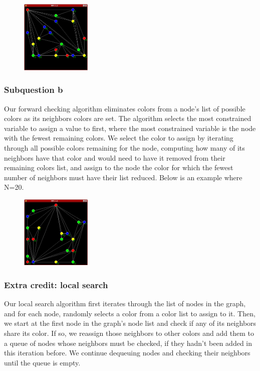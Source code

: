\begin{figure}[H]
  \centering
  \includegraphics[width=0.3\textwidth]{graphics/rand_assign_20.png}
\end{figure}

\subsubsection*{Subquestion b}
Our forward checking algorithm eliminates colors from a node's list of possible colors as its neighbors colors are set. The algorithm selects the most constrained variable to assign a value to first, where the most constrained variable is the node with the fewest remaining colors. We select the color to assign by iterating through all possible colors remaining for the node, computing how many of its neighbors have that color and would need to have it removed from their remaining colors list, and assign to the node the color for which the fewest number of neighbors must have their list reduced. Below is an example where N=20.

\begin{figure}[H]
  \centering
  \includegraphics[width=0.3\textwidth]{graphics/forward_assign_20.png}
\end{figure}

\subsubsection*{Extra credit: local search}
Our local search algorithm first iterates through the list of nodes in the graph, and for each node, randomly selects a color from a color list to assign to it. Then, we start at the first node in the graph's node list and check if any of its neighbors share its color. If so, we reassign those neighbors to other colors and add them to a queue of nodes whose neighbors must be checked, if they hadn't been added in this iteration before. We continue dequeuing nodes and checking their neighbors until the queue is empty.


